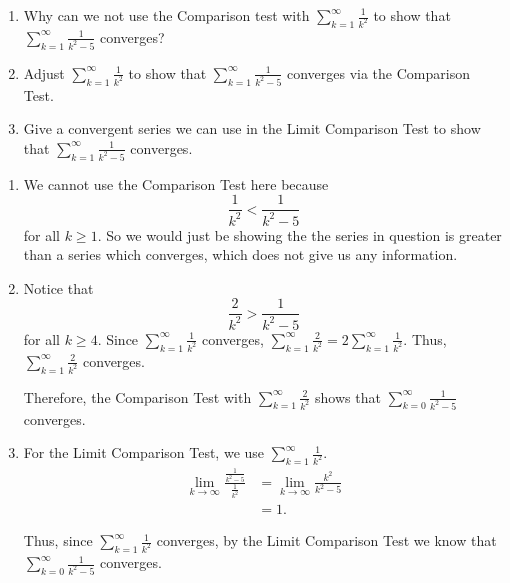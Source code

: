 \documentclass[]{ximera}
\begin{document}
\begin{problem}
	\begin{enumerate}
	
	\item  Why can we not use the Comparison test with $\sum_{k=1}^\infty \frac{1}{k^2}$ to show that $\sum_{k=1}^\infty \frac{1}{k^2 - 5}$ converges?
	
	\item  Adjust $\sum_{k=1}^\infty \frac{1}{k^2}$ to show that $\sum_{k=1}^\infty \frac{1}{k^2 - 5}$ converges via the Comparison Test.
	
	\item  Give a convergent series we can use in the Limit Comparison Test to show that $\sum_{k=1}^\infty \frac{1}{k^2 - 5}$ converges.  
	
	\end{enumerate}
	
	\begin{freeResponse}
		\begin{enumerate}
		
		\item  We cannot use the Comparison Test here because 
			\[
			\frac{1}{k^2} < \frac{1}{k^2 - 5}
			\]
		for all $k \geq 1$.  So we would just be showing the the series in question is greater than a series which converges, which does not give us any information.
		
		
		
		\item  Notice that
			\[
			\frac{2}{k^2} > \frac{1}{k^2 - 5}
			\]
		for all $k \geq 4$.  
		Since $\sum_{k=1}^\infty \frac{1}{k^2}$ converges, $\sum_{k=1}^\infty \frac{2}{k^2} = 2 \sum_{k=1}^\infty \frac{1}{k^2}$.  
		Thus, $\sum_{k=1}^\infty \frac{2}{k^2}$ converges.
		
		Therefore, the Comparison Test with $\sum_{k=1}^\infty \frac{2}{k^2}$ shows that $\sum_{k=0}^\infty \frac{1}{k^2-5}$ converges.
		
		
		
		\item  For the Limit Comparison Test, we  use $\sum_{k=1}^\infty \frac{1}{k^2}$.  
			\begin{align*}
			\lim_{k \to \infty} \frac{\frac{1}{k^2-5}}{\frac{1}{k^2}}
			&= \lim_{k \to \infty} \frac{k^2}{k^2-5}  \\
			&= 1.
			\end{align*}
			
		Thus, since $\sum_{k=1}^\infty \frac{1}{k^2}$ converges, by the Limit Comparison Test we know that $\sum_{k=0}^\infty \frac{1}{k^2-5}$ converges.
		
		\end{enumerate}
	\end{freeResponse}

\end{problem}
\end{document}
